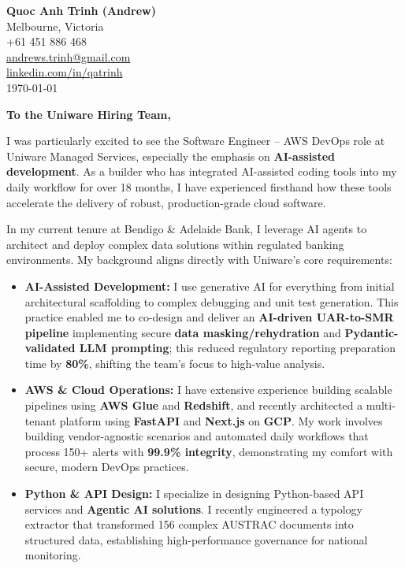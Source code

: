 \documentclass[11pt, a4paper]{article}
\begin{document}
\begin{flushleft}
\textbf{Quoc Anh Trinh (Andrew)} \\
Melbourne, Victoria \\
+61 451 886 468 \\
\href{mailto:andrews.trinh@gmail.com}{andrews.trinh@gmail.com} \\
\href{https://www.linkedin.com/in/qatrinh/}{linkedin.com/in/qatrinh} \\
\vspace{1em}
\today
\end{flushleft}

\vspace{1em}

\begin{flushleft}
\textbf{To the Uniware Hiring Team,}
\end{flushleft}

\vspace{1em}

I was particularly excited to see the Software Engineer – AWS DevOps role at Uniware Managed Services, especially the emphasis on \textbf{AI-assisted development}. As a builder who has integrated AI-assisted coding tools into my daily workflow for over 18 months, I have experienced firsthand how these tools accelerate the delivery of robust, production-grade cloud software.

In my current tenure at Bendigo \& Adelaide Bank, I leverage AI agents to architect and deploy complex data solutions within regulated banking environments. My background aligns directly with Uniware's core requirements:

\begin{itemize}
    \item \textbf{AI-Assisted Development:} I use generative AI for everything from initial architectural scaffolding to complex debugging and unit test generation. This practice enabled me to co-design and deliver an \textbf{AI-driven UAR-to-SMR pipeline} implementing secure \textbf{data masking/rehydration} and \textbf{Pydantic-validated LLM prompting}; this reduced regulatory reporting preparation time by \textbf{80\%}, shifting the team's focus to high-value analysis.
    \item \textbf{AWS \& Cloud Operations:} I have extensive experience building scalable pipelines using \textbf{AWS Glue} and \textbf{Redshift}, and recently architected a multi-tenant platform using \textbf{FastAPI} and \textbf{Next.js} on \textbf{GCP}. My work involves building vendor-agnostic scenarios and automated daily workflows that process 150+ alerts with \textbf{99.9\% integrity}, demonstrating my comfort with secure, modern DevOps practices.
    \item \textbf{Python \& API Design:} I specialize in designing Python-based API services and \textbf{Agentic AI solutions}. I recently engineered a typology extractor that transformed 156 complex AUSTRAC documents into structured data, establishing high-performance governance for national monitoring.
\end{itemize}
\end{document}
